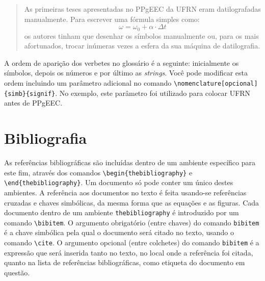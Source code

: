 \begin{quotation}
As primeiras teses apresentadas no PPgEEC da UFRN eram datilografadas
manualmente. Para escrever uma fórmula simples como:%
%
%
\begin{equation}
\omega = \omega_0 + \alpha \cdot \Delta t
\label{Eq:glossario}
\end{equation}%
%
%
%
%
os autores tinham que desenhar os símbolos manualmente ou, para os
mais afortunados, trocar inúmeras vezes a esfera da sua máquina de
datilografia.
\end{quotation}

A ordem de aparição dos verbetes no glossário é a seguinte:
inicialmente os símbolos, depois os números e por último as
\textit{strings}. Você pode modificar esta ordem incluindo um
parâmetro adicional no comando \verb|\nomenclature[opcional]{simb}{signif}|. No exemplo, este
parâmetro foi utilizado para colocar UFRN antes de PPgEEC.

\section{Bibliografia}
\label{Sec:citacoes}

As referências bibliográficas são incluídas dentro de um ambiente
específico para este fim, através dos comandos
\verb|\begin{thebibliography}| e \verb|\end{thebibliography}|. Um
documento só pode conter um único destes ambientes. A referência aos
documentos no texto é feita usando-se referências cruzadas e chaves
simbólicas, da mesma forma que as equações e as figuras. Cada
documento dentro de um ambiente \texttt{thebibliography} é introduzido
por um comando \verb|\bibitem|. O argumento obrigatório (entre chaves)
do comando \texttt{bibitem} é a chave simbólica pela qual o documento
será citado no texto, usando o comando \verb|\cite|.  O argumento
opcional (entre colchetes) do comando \texttt{bibitem} é a expressão
que será inserida tanto no texto, no local onde a referência foi
citada, quanto na lista de referências bibliográficas, como etiqueta
do documento em questão.


